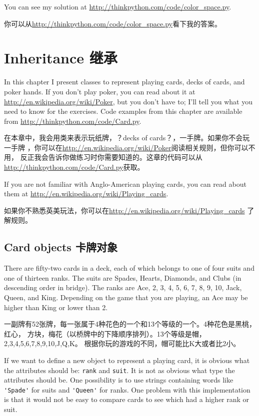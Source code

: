 \documentclass[10pt]{book}
\begin{document}
\begin{CJK}{UTF8}{gbsn}
\begin{exercise}
You can see my solution at \url{http://thinkpython.com/code/color_space.py}.

你可以从\url{http://thinkpython.com/code/color_space.py}看下我的答案。

\end{exercise}


\chapter{Inheritance 继承}

In this chapter I present classes to represent playing cards,
decks of cards, and poker hands.  If you don't play poker, you can
read about it at \url{http://en.wikipedia.org/wiki/Poker}, but you don't have
to; I'll tell you what you need to know for the exercises.
Code examples from this chapter are available from
\url{http://thinkpython.com/code/Card.py}.

在本章中，我会用类来表示玩纸牌，？decks of cards？，一手牌。如果你不会玩一手牌
，你可以在\url{http://en.wikipedia.org/wiki/Poker}阅读相关规则，但你可以不用，
反正我会告诉你做练习时你需要知道的。这章的代码可以从
\url{http://thinkpython.com/code/Card.py}获取。

If you are not familiar with Anglo-American playing cards,
you can read about them at \url{http://en.wikipedia.org/wiki/Playing_cards}.

如果你不熟悉英美玩法，你可以在\url{http://en.wikipedia.org/wiki/Playing_cards}
了解规则。


\section{Card objects 卡牌对象}

There are fifty-two cards in a deck, each of which belongs to one of
four suits and one of thirteen ranks.  The suits are Spades, Hearts,
Diamonds, and Clubs (in descending order in bridge).  The ranks are
Ace, 2, 3, 4, 5, 6, 7, 8, 9, 10, Jack, Queen, and King.  Depending on
the game that you are playing, an Ace may be higher than King
or lower than 2.

一副牌有52张牌，每一张属于4种花色的一个和13个等级的一个。4种花色是黑桃，红心，
方块，梅花（以桥牌中的下降顺序排列）。13个等级是帽，2,3,4,5,6,7,8,9,10,J,Q,K。
根据你玩的游戏的不同，帽可能比K大或者比2小。

If we want to define a new object to represent a playing card, it is
obvious what the attributes should be: {\tt rank} and
{\tt suit}.  It is not as obvious what type the attributes
should be.  One possibility is to use strings containing words like
\verb"'Spade'" for suits and \verb"'Queen'" for ranks.  One problem with
this implementation is that it would not be easy to compare cards to
see which had a higher rank or suit.


\end{CJK}
\end{document}
